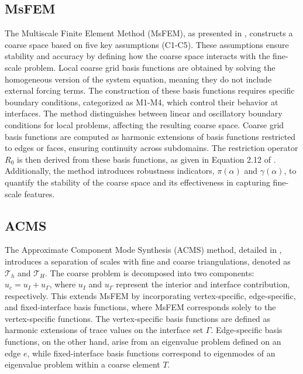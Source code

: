 \subsection{MsFEM} 
The Multiscale Finite Element Method (MsFEM), as presented in \cite{og_msfem_Hou1997,msfem_coarse_space_Graham_2007,msfem_for_darcy_Efendiev2011}, constructs a coarse space based on five key assumptions (C1-C5). These assumptions ensure stability and accuracy by defining how the coarse space interacts with the fine-scale problem. Local coarse grid basis functions are obtained by solving the homogeneous version of the system equation, meaning they do not include external forcing terms. The construction of these basis functions requires specific boundary conditions, categorized as M1-M4, which control their behavior at interfaces. The method distinguishes between linear and oscillatory boundary conditions for local problems, affecting the resulting coarse space. Coarse grid basis functions are computed as harmonic extensions of basis functions restricted to edges or faces, ensuring continuity across subdomains. The restriction operator $R_0$ is then derived from these basis functions, as given in Equation 2.12 of \cite{msfem_coarse_space_Graham_2007}. Additionally, the method introduces robustness indicators, $\pi(\alpha)$ and $\gamma(\alpha)$, to quantify the stability of the coarse space and its effectiveness in capturing fine-scale features.
 
\subsection{ACMS}
The Approximate Component Mode Synthesis (ACMS) method, detailed in \cite{acms_coarse_space_Heinlein2018}, introduces a separation of scales with fine and coarse triangulations, denoted as $\mathcal{T}_h$ and $\mathcal{T}_H$. The coarse problem is decomposed into two components: $u_c = u_I + u_{\Gamma}$, where $u_I$ and $u_{\Gamma}$ represent the interior and interface contribution, respectively. This extends MsFEM by incorporating vertex-specific, edge-specific, and fixed-interface basis functions, where MsFEM corresponds solely to the vertex-specific functions. The vertex-specific basis functions are defined as harmonic extensions of trace values on the interface set $\Gamma$. Edge-specific basis functions, on the other hand, arise from an eigenvalue problem defined on an edge $e$, while fixed-interface basis functions correspond to eigenmodes of an eigenvalue problem within a coarse element $T$.
    
